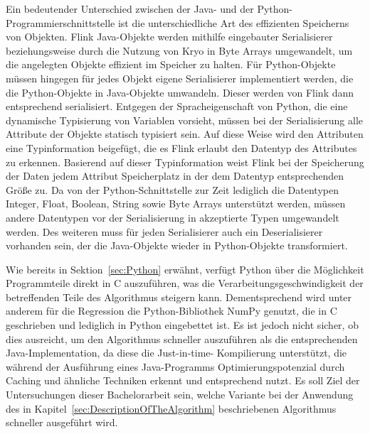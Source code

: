 Ein bedeutender Unterschied zwischen der Java- und der Python-Programmierschnittstelle ist die unterschiedliche Art des effizienten Speicherns von Objekten. Flink Java-Objekte werden mithilfe eingebauter Serialisierer beziehungsweise durch die Nutzung von Kryo in Byte Arrays umgewandelt, um die angelegten Objekte effizient im Speicher zu halten. Für Python-Objekte müssen hingegen für jedes Objekt eigene Serialisierer implementiert werden, die die Python-Objekte in Java-Objekte umwandeln. Dieser werden von Flink dann entsprechend serialisiert. Entgegen der Spracheigenschaft von Python, die eine dynamische Typisierung von Variablen vorsieht, müssen bei der Serialisierung alle Attribute der Objekte statisch typisiert sein. Auf diese Weise wird den Attributen eine Typinformation beigefügt, die es Flink erlaubt den Datentyp des Attributes zu erkennen. Basierend auf dieser Typinformation weist Flink bei der Speicherung der Daten jedem Attribut Speicherplatz in der dem Datentyp entsprechenden Größe zu. Da von der Python-Schnittstelle zur Zeit lediglich die Datentypen Integer, Float, Boolean, String sowie Byte Arrays unterstützt werden, müssen andere Datentypen vor der Serialisierung in akzeptierte Typen umgewandelt werden. Des weiteren muss für jeden Serialisierer auch ein Deserialisierer vorhanden sein, der die Java-Objekte wieder in Python-Objekte transformiert.

Wie bereits in Sektion~\ref{sec:Python} erwähnt, verfügt Python über die Möglichkeit Programmteile direkt in C auszuführen, was die Verarbeitungsgeschwindigkeit der betreffenden Teile des Algorithmus steigern kann. Dementsprechend wird unter anderem für die Regression die Python-Bibliothek NumPy genutzt, die in C geschrieben und lediglich in Python eingebettet ist. Es ist jedoch nicht sicher, ob dies ausreicht, um den Algorithmus schneller auszuführen als die entsprechenden Java-Implementation, da diese die Just-in-time- Kompilierung unterstützt, die während der Ausführung eines Java-Programms Optimierungspotenzial durch Caching und ähnliche Techniken erkennt und entsprechend nutzt. Es soll Ziel der Untersuchungen dieser Bachelorarbeit sein, welche Variante bei der Anwendung des in Kapitel~\ref{sec:DescriptionOfTheAlgorithm} beschriebenen Algorithmus schneller ausgeführt wird.

